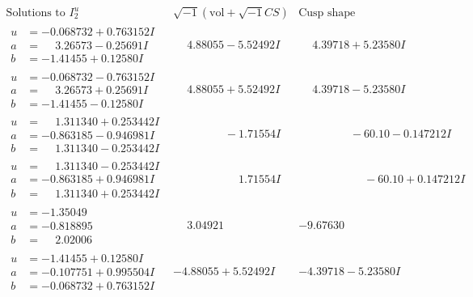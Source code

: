 \documentclass[1p]{elsarticle_modified}
\theoremstyle{definition}
\newcommand{\I}{\sqrt{-1}}
\begin{document}
$$\begin{array}{c|c|c}  
\text{Solutions to }I^u_{2}& \I (\text{vol} + \sqrt{-1}CS) & \text{Cusp shape}\\
 \hline 
\begin{aligned}
u &= -0.068732 + 0.763152 I \\
a &= \phantom{-}3.26573 - 0.25691 I \\
b &= -1.41455 + 0.12580 I\end{aligned}
 & \phantom{-}4.88055 - 5.52492 I & \phantom{-}4.39718 + 5.23580 I \\ \hline\begin{aligned}
u &= -0.068732 - 0.763152 I \\
a &= \phantom{-}3.26573 + 0.25691 I \\
b &= -1.41455 - 0.12580 I\end{aligned}
 & \phantom{-}4.88055 + 5.52492 I & \phantom{-}4.39718 - 5.23580 I \\ \hline\begin{aligned}
u &= \phantom{-}1.311340 + 0.253442 I \\
a &= -0.863185 - 0.946981 I \\
b &= \phantom{-}1.311340 - 0.253442 I\end{aligned}
 & \phantom{-0.000000 } -1.71554 I & \phantom{-0.000000 }      -6
0. 10   - 0.147212 I \\ \hline\begin{aligned}
u &= \phantom{-}1.311340 - 0.253442 I \\
a &= -0.863185 + 0.946981 I \\
b &= \phantom{-}1.311340 + 0.253442 I\end{aligned}
 & \phantom{-0.000000 -}1.71554 I & \phantom{-0.000000 -}     -6
0. 10   + 0.147212 I \\ \hline\begin{aligned}
u &= -1.35049\phantom{ +0.000000I} \\
a &= -0.818895\phantom{ +0.000000I} \\
b &= \phantom{-}2.02006\phantom{ +0.000000I}\end{aligned}
 & \phantom{-}3.04921\phantom{ +0.000000I} & -9.67630\phantom{ +0.000000I} \\ \hline\begin{aligned}
u &= -1.41455 + 0.12580 I \\
a &= -0.107751 + 0.995504 I \\
b &= -0.068732 + 0.763152 I\end{aligned}
 & -4.88055 + 5.52492 I & -4.39718 - 5.23580 I \\ \hline\begin{aligned}

\end{aligned}
\end{array}$$
\end{document}
